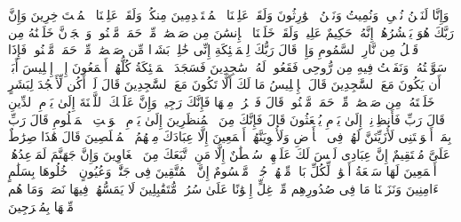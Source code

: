 \stopbuffer
\startbuffer[\q:15:23]
وَإِنَّا لَنَحۡنُ نُحۡیِۦ وَنُمِیتُ وَنَحۡنُ ٱلۡوَٰرِثُونَ%
\stopbuffer
\startbuffer[\q:15:24]
وَلَقَدۡ عَلِمۡنَا ٱلۡمُسۡتَقۡدِمِینَ مِنكُمۡ وَلَقَدۡ عَلِمۡنَا ٱلۡمُسۡتَءۡخِرِینَ%
\stopbuffer
\startbuffer[\q:15:25]
وَإِنَّ رَبَّكَ هُوَ یَحۡشُرُهُمۡۚ إِنَّهُۥ حَكِیمٌ عَلِیمࣱ%
\stopbuffer
\startbuffer[\q:15:26]
وَلَقَدۡ خَلَقۡنَا ٱلۡإِنسَٰنَ مِن صَلۡصَٰلࣲ مِّنۡ حَمَإࣲ مَّسۡنُونࣲ%
\stopbuffer
\startbuffer[\q:15:27]
وَٱلۡجَاۤنَّ خَلَقۡنَٰهُ مِن قَبۡلُ مِن نَّارِ ٱلسَّمُومِ%
\stopbuffer
\startbuffer[\q:15:28]
وَإِذۡ قَالَ رَبُّكَ لِلۡمَلَٰۤئِكَةِ إِنِّی خَٰلِقُۢ بَشَرࣰا مِّن صَلۡصَٰلࣲ مِّنۡ حَمَإࣲ مَّسۡنُونࣲ%
\stopbuffer
\startbuffer[\q:15:29]
فَإِذَا سَوَّیۡتُهُۥ وَنَفَخۡتُ فِیهِ مِن رُّوحِی فَقَعُوا۟ لَهُۥ سَٰجِدِینَ%
\stopbuffer
\startbuffer[\q:15:30]
فَسَجَدَ ٱلۡمَلَٰۤئِكَةُ كُلُّهُمۡ أَجۡمَعُونَ%
\stopbuffer
\startbuffer[\q:15:31]
إِلَّاۤ إِبۡلِیسَ أَبَىٰۤ أَن یَكُونَ مَعَ ٱلسَّٰجِدِینَ%
\stopbuffer
\startbuffer[\q:15:32]
قَالَ یَٰۤإِبۡلِیسُ مَا لَكَ أَلَّا تَكُونَ مَعَ ٱلسَّٰجِدِینَ%
\stopbuffer
\startbuffer[\q:15:33]
قَالَ لَمۡ أَكُن لِّأَسۡجُدَ لِبَشَرٍ خَلَقۡتَهُۥ مِن صَلۡصَٰلࣲ مِّنۡ حَمَإࣲ مَّسۡنُونࣲ%
\stopbuffer
\startbuffer[\q:15:34]
قَالَ فَٱخۡرُجۡ مِنۡهَا فَإِنَّكَ رَجِیمࣱ%
\stopbuffer
\startbuffer[\q:15:35]
وَإِنَّ عَلَیۡكَ ٱللَّعۡنَةَ إِلَىٰ یَوۡمِ ٱلدِّینِ%
\stopbuffer
\startbuffer[\q:15:36]
قَالَ رَبِّ فَأَنظِرۡنِیۤ إِلَىٰ یَوۡمِ یُبۡعَثُونَ%
\stopbuffer
\startbuffer[\q:15:37]
قَالَ فَإِنَّكَ مِنَ ٱلۡمُنظَرِینَ%
\stopbuffer
\startbuffer[\q:15:38]
إِلَىٰ یَوۡمِ ٱلۡوَقۡتِ ٱلۡمَعۡلُومِ%
\stopbuffer
\startbuffer[\q:15:39]
قَالَ رَبِّ بِمَاۤ أَغۡوَیۡتَنِی لَأُزَیِّنَنَّ لَهُمۡ فِی ٱلۡأَرۡضِ وَلَأُغۡوِیَنَّهُمۡ أَجۡمَعِینَ%
\stopbuffer
\startbuffer[\q:15:40]
إِلَّا عِبَادَكَ مِنۡهُمُ ٱلۡمُخۡلَصِینَ%
\stopbuffer
\startbuffer[\q:15:41]
قَالَ هَٰذَا صِرَٰطٌ عَلَیَّ مُسۡتَقِیمٌ%
\stopbuffer
\startbuffer[\q:15:42]
إِنَّ عِبَادِی لَیۡسَ لَكَ عَلَیۡهِمۡ سُلۡطَٰنٌ إِلَّا مَنِ ٱتَّبَعَكَ مِنَ ٱلۡغَاوِینَ%
\stopbuffer
\startbuffer[\q:15:43]
وَإِنَّ جَهَنَّمَ لَمَوۡعِدُهُمۡ أَجۡمَعِینَ%
\stopbuffer
\startbuffer[\q:15:44]
لَهَا سَبۡعَةُ أَبۡوَٰبࣲ لِّكُلِّ بَابࣲ مِّنۡهُمۡ جُزۡءࣱ مَّقۡسُومٌ%
\stopbuffer
\startbuffer[\q:15:45]
إِنَّ ٱلۡمُتَّقِینَ فِی جَنَّٰتࣲ وَعُیُونٍ%
\stopbuffer
\startbuffer[\q:15:46]
ٱدۡخُلُوهَا بِسَلَٰمٍ ءَامِنِینَ%
\stopbuffer
\startbuffer[\q:15:47]
وَنَزَعۡنَا مَا فِی صُدُورِهِم مِّنۡ غِلٍّ إِخۡوَٰنًا عَلَىٰ سُرُرࣲ مُّتَقَٰبِلِینَ%
\stopbuffer
\startbuffer[\q:15:48]
لَا یَمَسُّهُمۡ فِیهَا نَصَبࣱ وَمَا هُم مِّنۡهَا بِمُخۡرَجِینَ%
\stopbuffer

